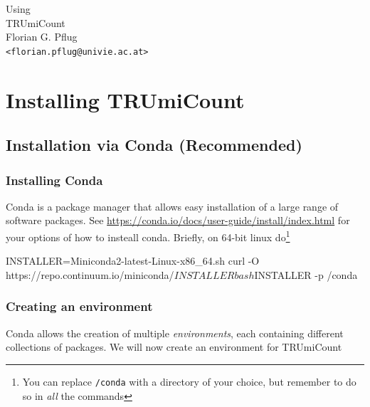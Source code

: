 \documentclass[10pt]{article}
\begin{document}
\begin{titlepage}
\vfill
{\Huge\centering%
Using\\
TRUmiCount\\}
\vskip5cm
{\large\centering%
Florian G. Pflug\\
\texttt{<florian.pflug@univie.ac.at>}\\}
\vfill
\tableofcontents
\vfill
\end{titlepage}



\newpage
\section{Installing TRUmiCount}

\subsection{Installation via Conda (Recommended)}

\subsubsection*{Installing Conda}

Conda is a package manager that allows easy installation of a large range of software packages. See \url{https://conda.io/docs/user-guide/install/index.html} for your options of how to insteall conda. Briefly, on 64-bit linux do\footnote{You can replace \texttt{/conda} with a directory of your choice, but remember to do so in \emph{all} the commands}

\begin{shellcode}
INSTALLER=Miniconda2-latest-Linux-x86_64.sh
curl -O https://repo.continuum.io/miniconda/$INSTALLER
bash $INSTALLER -p /conda
\end{shellcode}

\subsubsection*{Creating an environment}

Conda allows the creation of multiple \emph{environments}, each containing different collections of packages. We will now create an environment for TRUmiCount
\end{document}
